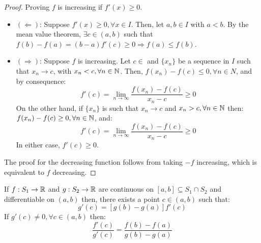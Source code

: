 \begin{proof}
    Proving $f$ is increasing if $f'(x) \geq 0$.
    \begin{itemize}
        \item $(\Longleftarrow)$: Suppose $f'(x) \geq 0, \forall x \in I$. Then, let $a,b \in I$ with $a < b$. By the mean value theorem, $\exists c \in (a,b)$ such that $f(b) - f(a) = (b-a)f'(c) \geq 0 \Longrightarrow f(a) \leq f(b)$.
        \item $(\Longrightarrow)$: Suppose $f$ is increasing. Let $c \in $ and $\{x_n\}$ be a sequence in $I$ such that $x_n \to c$, with $x_n < c, \forall n \in \mathbb{N}$. Then, $f(x_n) - f(c) \leq 0, \forall n \in N$, and by consequence:
            \begin{equation*}
                f'(c) = \lim \limits_{n \to \infty} \frac{f(x_n) - f(c)}{x_n - c} \geq 0
            \end{equation*}
            On the other hand, if $\{x_n\}$ is such that $x_n \to c$ and $x_n > c, \forall n \in \mathbb{N}$ then: $f(x_n) - f(c) \geq 0, \forall n \in \mathbb{N}$, and:
            \begin{equation*}
                f'(c) = \lim \limits_{n \to \infty} \frac{f(x_n) - f(c)}{x_n - c} \geq 0
            \end{equation*}
            In either case, $f'(c) \geq 0$.
    \end{itemize}
    The proof for the decreasing function follows from taking $-f$ increasing, which is equivalent to $f$ decreasing.
\end{proof}

\begin{theorem}
    If $f: S_1 \to \mathbb{R}$ and $g: S_2 \to \mathbb{R}$ are continuous on $[a,b] \subseteq S_1 \cap S_2$ and differentiable on $(a,b)$ then, there exists a point $c \in (a,b)$ such that:
    \begin{equation*}
        [f(b) - f(a)]g'(c) = [g(b) - g(a)]f'(c)
    \end{equation*}
    If $g'(c) \neq 0, \forall c \in (a,b)$ then:
    \begin{equation*}
        \frac{f'(c)}{g'(c)} = \frac{f(b) - f(a)}{g(b) - g(a)}
    \end{equation*}
\end{theorem}

